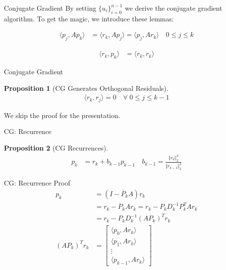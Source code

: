 \documentclass{beamer}
\newtheorem{prop}{Proposition}
\begin{document}
    \begin{frame}{Conjugate Gradient}
        By setting $\{u_i\}_{i = 0}^{n - 1}$ we derive the conjugate gradient algorithm. To get the magic, we introduce these lemmas: 
        \begin{lemma}[CG Lemma 1]\small
            \begin{align}
                    \langle p_{j}, Ap_k\rangle
                    &=\langle r_k, Ap_{j}\rangle
                    = \langle p_{j}, Ar_k\rangle \quad 0 \le j \le k 
            \end{align}
        \end{lemma}
        \begin{lemma}[CG Lemma 2]\small
            \begin{align}
                \langle r_k, p_k\rangle &= \langle r_k, r_k\rangle
            \end{align}
        \end{lemma}
        
    \end{frame}
    \begin{frame}{Conjugate Gradient}
        \begin{prop}[CG Generates Orthogonal Residuals]\small
            \begin{align}
                \langle r_k , r_j \rangle = 0 \quad \forall\; 0 \le j \le k - 1 
            \end{align}
        \end{prop}
        We skip the proof for the presentation. 
    \end{frame}
    \begin{frame}{CG: Recurrence}
        \begin{prop}[CG Recurrences]
            \begin{align}
                p_k &= r_k + b_{k - 1}p_{k - 1} \quad b_{k - 1} = \frac{\Vert r_k\Vert_2^2}
                {\Vert r_{k - 1}\Vert_2^2}
            \end{align}
        \end{prop}
    \end{frame}
    \begin{frame}{CG: Recurrence Proof}
        \begin{align}
            p_k &= (I - \overline{P}_kA)r_k 
            \\
            &= r_k - \overline{P}_kAr_k = 
            r_k - P_kD^{-1}_kP^T_kAr_k
            \\
            &= r_k - P_kD^{-1}_k(AP_k)^Tr_k
            \\
            (AP_k)^Tr_k &= 
            \begin{bmatrix}
                \langle p_0, Ar_k\rangle
                \\
                \langle p_1, Ar_k\rangle
                \\
                \vdots
                \\
                \langle p_{k - 1}, Ar_k\rangle
            \end{bmatrix}
        \end{align}
        
    \end{frame}
\end{document}
